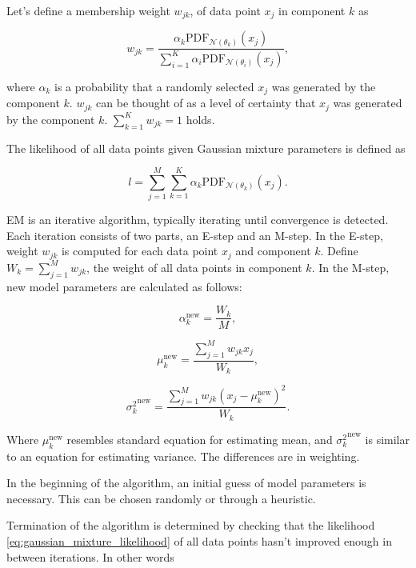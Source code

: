 \documentclass[thesis=B,english]{FITthesis}[2012/06/26]
\begin{document}
Let's define a membership weight $w_{jk}$, of data point $x_j$ in component $k$ as

\begin{equation*}
w_{jk} = \frac{\alpha_k \text{PDF}_{\mathcal{N}(\theta_k)}(x_j)}{\sum_{i=1}^K \alpha_i \text{PDF}_{\mathcal{N}(\theta_i)}(x_j)},
\end{equation*}

where $\alpha_k$ is a probability that a randomly selected $x_j$ was generated by the component $k$. $w_{jk}$ can be thought of as a level of certainty that $x_j$ was generated by the component $k$. $\sum_{k=1}^K w_{jk} = 1$ holds.

The likelihood of all data points given Gaussian mixture parameters is defined as

\begin{equation} \label{eq:gaussian_mixture_likelihood}
l = \sum_{j=1}^{M} \sum_{k=1}^{K} \alpha_k \text{PDF}_{\mathcal{N}(\theta_k)}(x_j).
\end{equation}

EM is an iterative algorithm, typically iterating until convergence is detected. Each iteration consists of two parts, an E-step and an M-step. In the E-step, weight $w_{jk}$ is computed for each data point $x_j$ and component $k$. Define $W_k = \sum_{j=1}^{M} w_{jk}$, the weight of all data points in component $k$. In the M-step, new model parameters are calculated as follows:

\begin{equation*}
\alpha_k^{\text{new}} = \frac{W_k}{M},
\end{equation*}

\begin{equation*}
\mu_k^{\text{new}} = \frac{\sum_{j=1}^M w_{jk} x_j}{W_k},
\end{equation*}

\begin{equation*}
{\sigma_k^{2}}^{\text{new}} = \frac{\sum_{j=1}^M w_{jk} (x_j-\mu_k^{\text{new}})^2}{W_k}.
\end{equation*}

Where $\mu_k^{\text{new}}$ resembles standard equation for estimating mean, and 
${\sigma_k^{2}}^{\text{new}}$ is similar to an equation for estimating variance. The differences are in weighting.

In the beginning of the algorithm, an initial guess of model parameters is necessary. This can be chosen randomly or through a heuristic.

Termination of the algorithm is determined by checking that the likelihood \ref{eq:gaussian_mixture_likelihood} of all data points hasn't improved enough in between iterations. In other words
\end{document}
